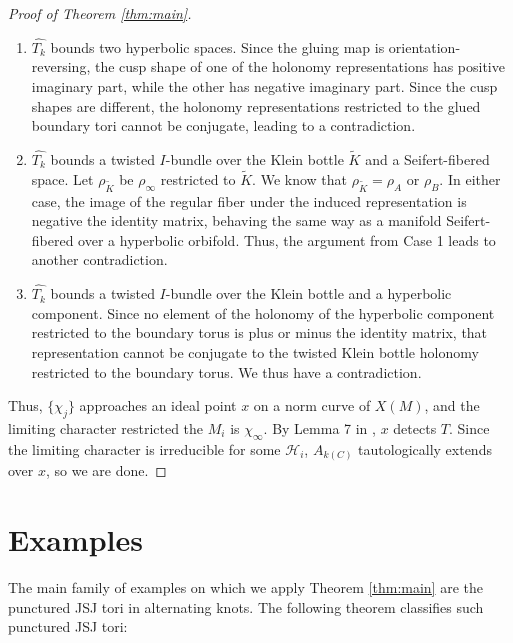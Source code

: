 \documentclass{article}
\theoremstyle{plain}
\theoremstyle{definition}
\theoremstyle{plain}
\theoremstyle{plain}
\theoremstyle{plain}
\theoremstyle{remark}
\theoremstyle{remark}
\theoremstyle{plain}
\theoremstyle{plain}
\begin{document}
\begin{proof}[Proof of Theorem \ref{thm:main}]
\begin{enumerate}
		\item $\widehat{T_k}$ bounds two hyperbolic spaces. Since the gluing map is orientation-reversing, the cusp shape of one of the holonomy representations has positive imaginary part, while the other has negative imaginary part. Since the cusp shapes are different, the holonomy representations restricted to the glued boundary tori cannot be conjugate, leading to a contradiction.  
		\item $\widehat{T_k}$ bounds a twisted $I$-bundle over the Klein bottle $\tilde{K}$ and a Seifert-fibered space. Let $\rho_{\tilde{K}}$ be $\rho_\infty$ restricted to $\tilde{K}$. We know that $\rho_{\tilde{K}} = \rho_A$ or $\rho_B$. In either case, the image of the regular fiber under the induced representation is negative the identity matrix, behaving the same way as a manifold Seifert-fibered over a hyperbolic orbifold. Thus, the argument from Case 1 leads to another contradiction. 
		\item $\widehat{T_k}$ bounds a twisted $I$-bundle over the Klein bottle and a hyperbolic component. Since no element of the holonomy of the hyperbolic component restricted to the boundary torus is plus or minus the identity matrix, that representation cannot be conjugate to the twisted Klein bottle holonomy restricted to the boundary torus. We thus have a contradiction.
	\end{enumerate}
	Thus, $\{\chi_j\}$ approaches an ideal point $x$ on a norm curve of $X(M)$, and the limiting character restricted the $M_i$ is $\chi_\infty$. By Lemma 7 in \cite{Paoluzzi2010ConwaySA}, $x$ detects $T$. Since the limiting character is irreducible for some $\mathcal{H}_i$, $A_{k(C)}$ tautologically extends over $x$, so we are done. 
\end{proof}

\section{Examples}\label{sec:examples}

The main family of examples on which we apply Theorem \ref{thm:main} are the punctured JSJ tori in alternating knots. The following theorem classifies such punctured JSJ tori:
\end{document}

